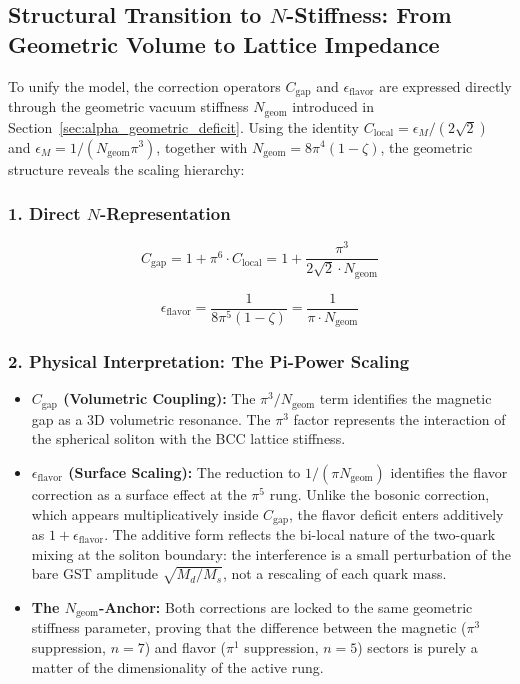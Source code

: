 \documentclass[10pt,a4paper]{article}
\begin{document}
\subsection{Structural Transition to \(N\)-Stiffness: From Geometric Volume to Lattice Impedance}
\label{sec:n_transition}

To unify the model, the correction operators \(C_{\text{gap}}\) and
$\epsilon_{\text{flavor}}$ are expressed directly through the geometric
vacuum stiffness \(N_{\text{geom}}\) introduced in
Section~\ref{sec:alpha_geometric_deficit}. Using the identity
\(C_{\text{local}} = \epsilon_M/(2\sqrt{2})\) and
\(\epsilon_M = 1/(N_{\text{geom}}\pi^3)\), together with
\(N_{\text{geom}} = 8\pi^4(1-\zeta)\), the geometric structure reveals
the scaling hierarchy:

\subsubsection*{1. Direct \(N\)-Representation}

\begin{equation}
	C_{\text{gap}} = 1 + \pi^6 \cdot C_{\text{local}} = 1 + \frac{\pi^3}{2\sqrt{2} \cdot N_{\text{geom}}}
\end{equation}

\begin{equation}
	\epsilon_{\text{flavor}} = \frac{1}{8\pi^5(1-\zeta)} = \frac{1}{\pi \cdot N_{\text{geom}}}
	\label{eq:eps_flavor_N_repr}
\end{equation}

\subsubsection*{2. Physical Interpretation: The Pi-Power Scaling}

\begin{itemize}
	\item \textbf{\(C_{\text{gap}}\) (Volumetric Coupling):} The
	\(\pi^3/N_{\text{geom}}\) term identifies the magnetic gap as a
	3D volumetric resonance. The \(\pi^3\) factor represents the
	interaction of the spherical soliton with the BCC lattice
	stiffness.
	
	\item \textbf{$\epsilon_{\text{flavor}}$ (Surface Scaling):} The
	reduction to $1/(\pi N_{\text{geom}})$ identifies the flavor
	correction as a surface effect at the $\pi^5$ rung. Unlike the
	bosonic correction, which appears multiplicatively inside
	$C_{\text{gap}}$, the flavor deficit enters additively as
	$1 + \epsilon_{\text{flavor}}$. The additive form reflects the
	bi-local nature of the two-quark mixing at the soliton boundary:
	the interference is a small perturbation of the bare GST
	amplitude $\sqrt{M_d/M_s}$, not a rescaling of each quark mass.
	
	\item \textbf{The \(N_{\text{geom}}\)-Anchor:} Both corrections
	are locked to the same geometric stiffness parameter, proving
	that the difference between the magnetic ($\pi^3$ suppression,
	$n=7$) and flavor ($\pi^1$ suppression, $n=5$) sectors is
	purely a matter of the dimensionality of the active rung.
\end{itemize}
\end{document}
